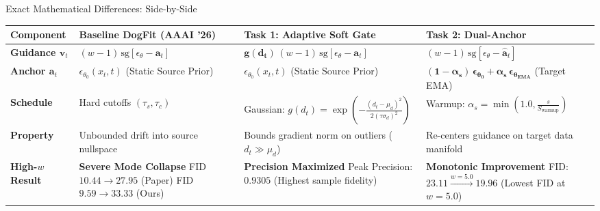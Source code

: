 \documentclass[aspectratio=169]{beamer}
\begin{document}
\begin{frame}{Exact Mathematical Differences: Side-by-Side}
    \centering
    \tiny
    \renewcommand{\arraystretch}{1.08}
    \setlength{\tabcolsep}{2.5pt}
    \begin{tabular}{l >{\centering\arraybackslash}m{3.1cm} >{\centering\arraybackslash}m{3.5cm} >{\centering\arraybackslash}m{3.6cm}}
        \toprule
        \textbf{Component} & 
        \textbf{Baseline DogFit} (AAAI '26) & 
        \textbf{Task 1: Adaptive Soft Gate} & 
        \textbf{Task 2: Dual-Anchor} \\
        \midrule
        \textbf{Guidance $\mathbf{v}_t$} & 
        $(w - 1)\,\text{sg}[\epsilon_\theta - \mathbf{a}_t]$ & 
        $\mathbf{g(d_t)}\,(w - 1)\,\text{sg}[\epsilon_\theta - \mathbf{a}_t]$ & 
        $(w - 1)\,\text{sg}[\epsilon_\theta - \mathbf{\hat{a}}_t]$ \\
        \addlinespace[2pt]
        \textbf{Anchor $\mathbf{a}_t$} & 
        $\epsilon_{\theta_0}(x_t, t)$ (Static Source Prior) & 
        $\epsilon_{\theta_0}(x_t, t)$ (Static Source Prior) & 
        $\mathbf{(1 - \alpha_s)\,\epsilon_{\theta_0} + \alpha_s\,\epsilon_{\theta_{\text{EMA}}}}$ (Target EMA) \\
        \addlinespace[2pt]
        \textbf{Schedule} & 
        Hard cutoffs $(\tau_s, \tau_c)$ & 
        Gaussian: $g(d_t) = \exp\left(-\frac{(d_t - \mu_d)^2}{2(\tau \sigma_d)^2}\right)$ & 
        Warmup: $\alpha_s = \min\left(1.0, \frac{s}{S_{\text{warmup}}}\right)$ \\
        \addlinespace[2pt]
        \textbf{Property} & 
        Unbounded drift into source nullspace & 
        Bounds gradient norm on outliers ($d_t \gg \mu_d$) & 
        Re-centers guidance on target data manifold \\
        \addlinespace[2pt]
        \textbf{High-$w$ Result} & 
        \textbf{Severe Mode Collapse} \newline FID $10.44 \to \mathbf{27.95}$ (Paper) \newline FID $9.59 \to \mathbf{33.33}$ (Ours) & 
        \textbf{Precision Maximized} \newline Peak Precision: $\mathbf{0.9305}$ \newline (Highest sample fidelity) & 
        \textbf{Monotonic Improvement} \newline FID: $\mathbf{23.11} \xrightarrow{w=5.0} \mathbf{19.96}$ \newline (Lowest FID at $w=5.0$) \\
        \bottomrule
    \end{tabular}
\end{frame}
\end{document}
